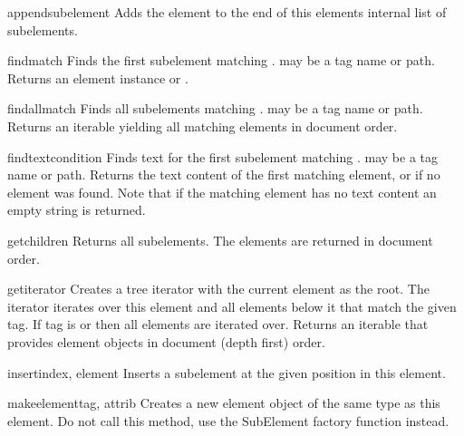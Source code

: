 \begin{methoddesc}{append}{subelement}
Adds the element  to the end of this elements internal list
of subelements.
\end{methoddesc}

\begin{methoddesc}{find}{match}
Finds the first subelement matching . 
 may be a tag name or path.
Returns an element instance or .
\end{methoddesc}

\begin{methoddesc}{findall}{match}
Finds all subelements matching . 
 may be a tag name or path.
Returns an iterable yielding all matching elements in document order.
\end{methoddesc}

\begin{methoddesc}{findtext}{condition}
Finds text for the first subelement matching . 
 may be a tag name or path.
Returns the text content of the first matching element, or
 if no element was found.  Note that if the
matching element has no text content an empty string is returned.
\end{methoddesc}

\begin{methoddesc}{getchildren}{}
Returns all subelements.  The elements are returned in document order.
\end{methoddesc}

\begin{methoddesc}{getiterator}{}
Creates a tree iterator with the current element as the root.  
The iterator iterates over this element and all elements below it 
that match the given tag. If tag
is  or  then all elements are iterated over.
Returns an iterable that provides element objects in document (depth first)
order.
\end{methoddesc}

\begin{methoddesc}{insert}{index, element}
Inserts a subelement at the given position in this element.
\end{methoddesc}

\begin{methoddesc}{makeelement}{tag, attrib}
Creates a new element object of the same type as this element.
Do not call this method, use the SubElement factory function instead.
\end{methoddesc}

